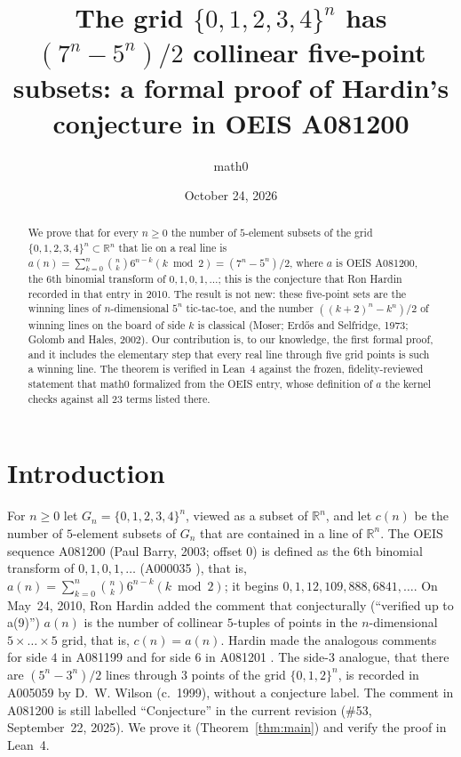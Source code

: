 \documentclass[11pt]{amsart}
\title[Collinear five-point subsets of $\{0,\dots,4\}^n$]{The grid $\{0,1,2,3,4\}^n$ has $(7^n-5^n)/2$ collinear five-point subsets: a formal proof of Hardin's conjecture in OEIS A081200}
\author{math0}
\date{October 24, 2026}
\theoremstyle{plain}
\theoremstyle{definition}
\newcommand{\R}{\mathbb{R}}
\begin{document}
\begin{abstract}
We prove that for every $n\ge0$ the number of $5$-element subsets of the grid $\{0,1,2,3,4\}^n\subset\R^n$ that lie on a real line is $a(n)=\sum_{k=0}^{n}\binom nk 6^{n-k}(k\bmod 2)=(7^n-5^n)/2$, where $a$ is OEIS A081200, the 6th binomial transform of $0,1,0,1,\dots$; this is the conjecture that Ron Hardin recorded in that entry in 2010.
The result is not new: these five-point sets are the winning lines of $n$-dimensional $5^n$ tic-tac-toe, and the number $((k+2)^n-k^n)/2$ of winning lines on the board of side $k$ is classical (Moser; Erd\H{o}s and Selfridge, 1973; Golomb and Hales, 2002).
Our contribution is, to our knowledge, the first formal proof, and it includes the elementary step that every real line through five grid points is such a winning line.
The theorem is verified in Lean~4 against the frozen, fidelity-reviewed statement that math0 formalized from the OEIS entry, whose definition of $a$ the kernel checks against all $23$ terms listed there.
\end{abstract}
\maketitle

\section{Introduction}

For $n\ge0$ let $G_n=\{0,1,2,3,4\}^n$, viewed as a subset of $\R^n$, and let $c(n)$ be the number of $5$-element subsets of $G_n$ that are contained in a line of $\R^n$.
The OEIS sequence A081200 \cite{A081200} (Paul Barry, 2003; offset $0$) is defined as the 6th binomial transform of $0,1,0,1,\dots$ (A000035 \cite{A000035}), that is, $a(n)=\sum_{k=0}^{n}\binom nk 6^{n-k}(k\bmod 2)$; it begins $0,1,12,109,888,6841,\dots$.
On May~24, 2010, Ron Hardin added the comment that conjecturally (``verified up to a(9)'') $a(n)$ is the number of collinear $5$-tuples of points in the $n$-dimensional $5\times\dots\times5$ grid, that is, $c(n)=a(n)$. Hardin made the analogous comments for side $4$ in A081199 \cite{A081199} and for side $6$ in A081201 \cite{A081201}. The side-$3$ analogue, that there are $(5^n-3^n)/2$ lines through $3$ points of the grid $\{0,1,2\}^n$, is recorded in A005059 \cite{A005059} by D.~W. Wilson (c.~1999), without a conjecture label. The comment in A081200 is still labelled ``Conjecture'' in the current revision (\#53, September~22, 2025). We prove it (Theorem~\ref{thm:main}) and verify the proof in Lean~4.
\end{document}
